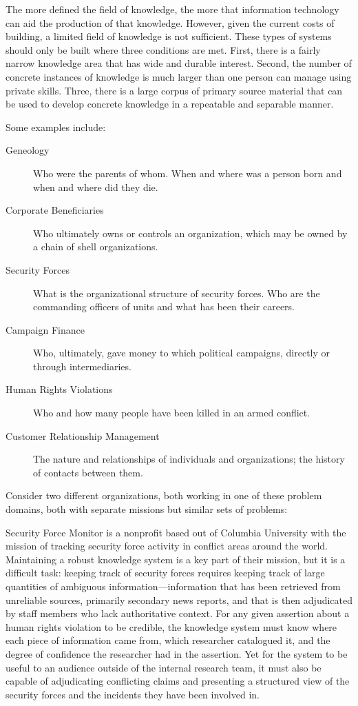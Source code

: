 \documentclass[format=siggraph, review=true]{acmart}
\begin{document}
The more defined the field of knowledge, the more that information
technology can aid the production of that knowledge. However, given
the current costs of building, a limited field of knowledge is not
sufficient. These types of systems should only be built where three
conditions are met. First, there is a fairly narrow knowledge area that
has wide and durable interest. Second, the number of concrete instances
of knowledge is much larger than one person can manage using private
skills. Three, there is a large corpus of primary source material that
can be used to develop concrete knowledge in a repeatable and
separable manner.

Some examples include:

\begin{description}
  \item [Geneology] Who were the parents of whom. When and where was a person
    born and when and where did they die.
  \item [Corporate Beneficiaries] Who ultimately owns or controls an
    organization, which may be owned by a chain of shell organizations.
  \item [Security Forces] What is the organizational structure of
    security forces. Who are the commanding officers of units and
    what has been their careers.
  \item [Campaign Finance] Who, ultimately, gave money to which
    political campaigns, directly or through intermediaries.
  \item [Human Rights Violations] Who and how many people have been
    killed in an armed conflict.
  \item [Customer Relationship Management] The nature and relationships of individuals and organizations; the history of contacts between them. 
\end{description}

Consider two different organizations, both working in one of these problem
domains, both with separate missions but similar sets of problems:

Security Force Monitor is a nonprofit based out of Columbia University
with the mission of tracking security force activity in conflict areas
around the world.\cite{sfm} Maintaining a robust knowledge system is a
key part of their mission, but it is a difficult task: keeping track
of security forces requires keeping track of large quantities of
ambiguous information—information that has been retrieved from
unreliable sources, primarily secondary news reports, and that is then
adjudicated by staff members who lack authoritative context. For any
given assertion about a human rights violation to be credible, the
knowledge system must know where each piece of information came from,
which researcher catalogued it, and the degree of confidence the
researcher had in the assertion. Yet for the system to be useful to an
audience outside of the internal research team, it must also be
capable of adjudicating conflicting claims and presenting a structured
view of the security forces and the incidents they have been involved
in.
\end{document}
